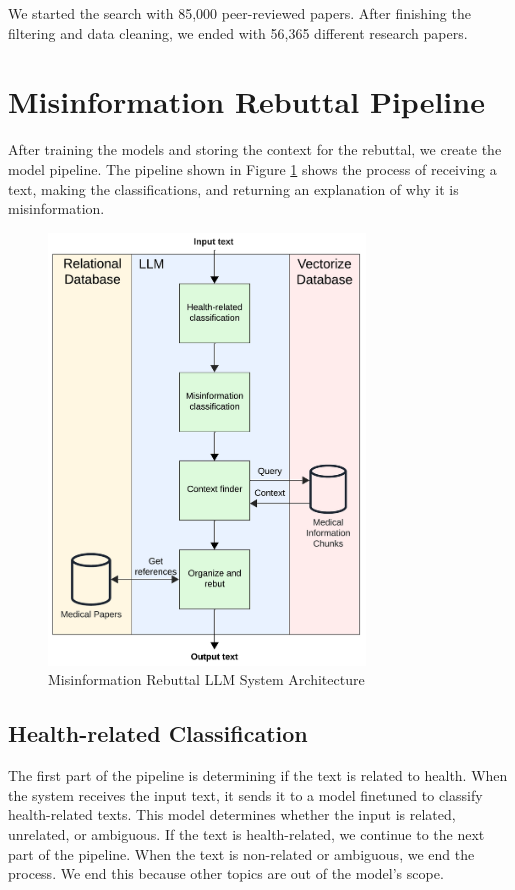 We started the search with 85,000 peer-reviewed papers. After finishing the filtering and data cleaning, we ended with 56,365 different research papers. 



\section{Misinformation Rebuttal Pipeline}
After training the models and storing the context for the rebuttal, we create the model pipeline. The pipeline shown in Figure \ref{fig:llm} shows the process of receiving a text, making the classifications, and returning an explanation of why it is misinformation.

\begin{figure}[H]
	\begin{center}
		\includegraphics[width=0.75\textwidth]{images/LLM_Pipeline} %
	\end{center}
	\caption{Misinformation Rebuttal LLM System Architecture} %
	\label{fig:llm}
\end{figure}


\subsection{Health-related Classification}
The first part of the pipeline is determining if the text is related to health. When the system receives the input text, it sends it to a model finetuned to classify health-related texts. This model determines whether the input is related, unrelated, or ambiguous.
If the text is health-related, we continue to the next part of the pipeline. When the text is non-related or ambiguous, we end the process. We end this because other topics are out of the model's scope. 

